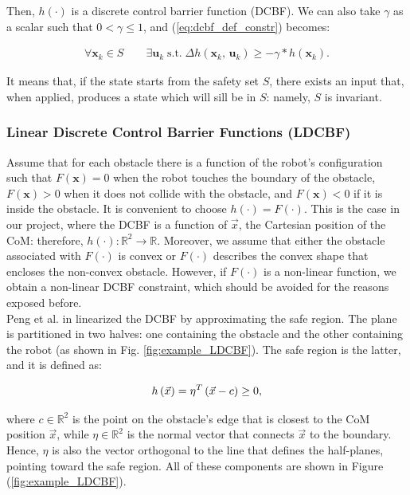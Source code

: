 \documentclass[main.tex]{subfiles}
\begin{document}
Then, $h(\cdot)$ is a discrete control barrier function (DCBF). We can also take $\gamma$ as a scalar such that $0 < \gamma \leq 1$, and (\ref{eq:dcbf_def_constr}) becomes:

\begin{gather*}
    \forall \mathbf{x}_k \in S \qquad \exists \mathbf{u}_k \; \text{s.t.} \; \Delta h(\mathbf{x}_k,\, \mathbf{u}_k) \geq -\gamma * h(\mathbf{x}_k). 
\end{gather*}

It means that, if the state starts from the safety set $S$, there exists an input that, when applied, produces a state which will sill be in $S$: namely, $S$ is invariant.

\subsubsection{Linear Discrete Control Barrier Functions (LDCBF)}
Assume that for each obstacle there is a function of the robot's configuration such that $F(\mathbf{x})=0$ when the robot touches the boundary of the obstacle, $F(\mathbf{x})>0$ when it does not collide with the obstacle, and $F(\mathbf{x})<0$ if it is inside the obstacle. It is convenient to choose $h(\cdot)=F(\cdot)$. This is the case in our project, where the DCBF is a function of $\vec{x}$, the Cartesian position of the CoM: therefore, $h(\cdot)\colon \mathbb{R}^2 \rightarrow \mathbb{R}$. Moreover, we assume that either the obstacle associated with $F(\cdot)$ is convex or $F(\cdot)$ describes the convex shape that encloses the non-convex obstacle.
However, if $F(\cdot)$ is a non-linear function, we obtain a non-linear DCBF constraint, which should be avoided for the reasons exposed before.\\
Peng et al. in \cite{peng_main_paper} linearized the DCBF by approximating the safe region. The plane is partitioned in two halves: one containing the obstacle and the other containing the robot (as shown in Fig. \ref{fig:example_LDCBF}).
The safe region is the latter, and it is defined as:

\begin{equation} \notag
h\left(\vec{x}\right) = \eta^T \left(\vec{x} - c\right) \geq 0,
\end{equation}

where $c \in \mathbb{R}^2$ is the point on the obstacle's edge that is closest to the CoM position $\vec{x}$, while $\eta \in \mathbb{R}^2$ is the normal vector that connects $\vec{x}$ to the boundary. Hence, $\eta$ is also the vector orthogonal to the line that defines the half-planes, pointing toward the safe region. All of these components are shown in Figure (\ref{fig:example_LDCBF}).\\
\end{document}
